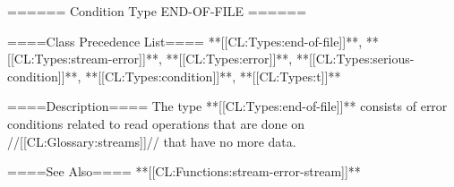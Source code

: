 ====== Condition Type END-OF-FILE ======

====Class Precedence List==== **[[CL:Types:end-of-file]]**, **[[CL:Types:stream-error]]**, **[[CL:Types:error]]**, **[[CL:Types:serious-condition]]**, **[[CL:Types:condition]]**, **[[CL:Types:t]]**

====Description====
The type **[[CL:Types:end-of-file]]** consists of error conditions related to read operations that are done on //[[CL:Glossary:streams]]// that have no more data.

====See Also====
**[[CL:Functions:stream-error-stream]]**

